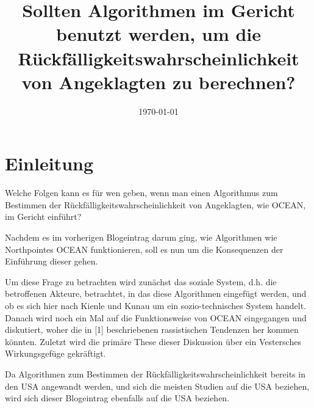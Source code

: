 \documentclass[10pt, a4paper, twocolumn]{article} %
\title{Sollten Algorithmen im Gericht benutzt werden, um die Rückfälligkeitswahrscheinlichkeit von Angeklagten zu berechnen? } %
\author{
	\authorstyle{Gruppe: 10\\ Journalist: Jonas Opitz\\ Chefredakteur: Frank Eric Mbouga} %
}
\date{\today} %
\begin{document}
\maketitle %

\thispagestyle{firstpage} %


\section{Einleitung}
Welche Folgen kann es für wen geben, wenn man einen Algorithmus zum Bestimmen der Rückfälligkeitswahrscheinlichkeit von Angeklagten, wie OCEAN, im Gericht einführt?

Nachdem es im vorherigen Blogeintrag darum ging, wie Algorithmen wie Northpointes OCEAN funktionieren, soll es nun um die Konsequenzen der Einführung dieser gehen.

Um diese Frage zu betrachten wird zunächst das soziale System, d.h. die betroffenen Akteure, betrachtet, in das diese Algorithmen eingefügt werden, und ob es sich hier nach Kienle und Kunau um ein sozio-technisches System handelt.
Danach wird noch ein Mal auf die Funktionsweise von OCEAN eingegangen und diskutiert, woher die in [1] beschriebenen rassistischen Tendenzen her kommen könnten.
Zuletzt wird die primäre These dieser Diskussion über ein Vestersches Wirkungsgefüge gekräftigt.

Da Algorithmen zum Bestimmen der Rückfälligkeitswahrscheinlichkeit bereits in den USA angewandt werden, und sich die meisten Studien auf die USA beziehen, wird sich dieser Blogeintrag ebenfalls auf die USA beziehen.
\end{document}
